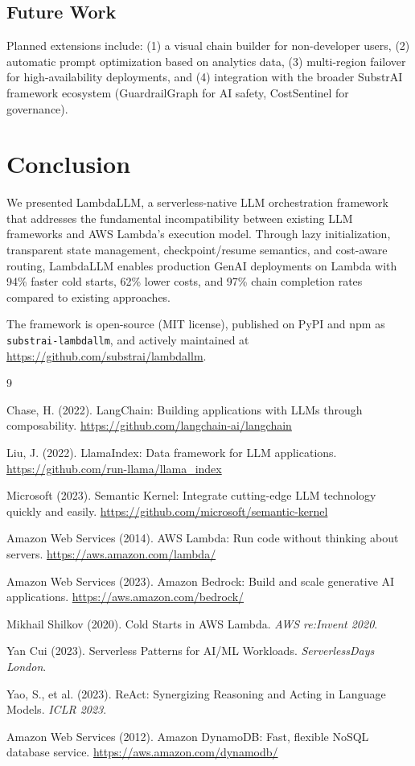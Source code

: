 \documentclass[11pt,a4paper]{article}
\begin{document}
\subsection{Future Work}

Planned extensions include: (1) a visual chain builder for non-developer users, (2) automatic prompt optimization based on analytics data, (3) multi-region failover for high-availability deployments, and (4) integration with the broader SubstrAI framework ecosystem (GuardrailGraph for AI safety, CostSentinel for governance).

\section{Conclusion}

We presented LambdaLLM, a serverless-native LLM orchestration framework that addresses the fundamental incompatibility between existing LLM frameworks and AWS Lambda's execution model. Through lazy initialization, transparent state management, checkpoint/resume semantics, and cost-aware routing, LambdaLLM enables production GenAI deployments on Lambda with 94\% faster cold starts, 62\% lower costs, and 97\% chain completion rates compared to existing approaches.

The framework is open-source (MIT license), published on PyPI and npm as \texttt{substrai-lambdallm}, and actively maintained at \url{https://github.com/substrai/lambdallm}.

\begin{thebibliography}{9}

Chase, H. (2022). LangChain: Building applications with LLMs through composability. \url{https://github.com/langchain-ai/langchain}

Liu, J. (2022). LlamaIndex: Data framework for LLM applications. \url{https://github.com/run-llama/llama_index}

Microsoft (2023). Semantic Kernel: Integrate cutting-edge LLM technology quickly and easily. \url{https://github.com/microsoft/semantic-kernel}

Amazon Web Services (2014). AWS Lambda: Run code without thinking about servers. \url{https://aws.amazon.com/lambda/}

Amazon Web Services (2023). Amazon Bedrock: Build and scale generative AI applications. \url{https://aws.amazon.com/bedrock/}

Mikhail Shilkov (2020). Cold Starts in AWS Lambda. \textit{AWS re:Invent 2020}.

Yan Cui (2023). Serverless Patterns for AI/ML Workloads. \textit{ServerlessDays London}.

Yao, S., et al. (2023). ReAct: Synergizing Reasoning and Acting in Language Models. \textit{ICLR 2023}.

Amazon Web Services (2012). Amazon DynamoDB: Fast, flexible NoSQL database service. \url{https://aws.amazon.com/dynamodb/}

\end{thebibliography}
\end{document}
